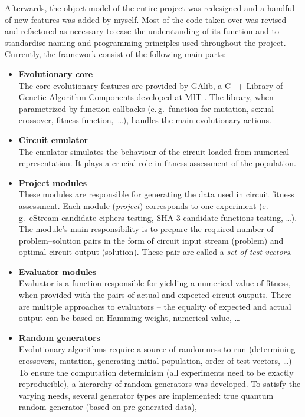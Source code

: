 \documentclass[12pt,oneside]{fithesis2}		%
\renewcommand{\_}{\leavevmode \kern0.0em\vbox{\hrule width0.4em}}
\newcommand{\squarebullet}{\textcolor{black}{\raisebox{0.15em}{\rule{4pt}{4pt}}}}
\newenvironment{myItemize}{
  \begin{itemize}[leftmargin=2em,rightmargin=1em,itemsep=\parskip ,parsep=0em,topsep=0em,partopsep=0em]
  \renewcommand{\labelitemi}{\squarebullet}
  \renewcommand{\labelitemii}{$\diamond$}
}{
  \end{itemize}
}
\begin{document}
Afterwards, the object model of the entire project was redesigned and a handful of new features was added by myself. 
Most of the code taken over was revised and refactored as necessary
to ease the understanding of its function and to standardise naming and programming principles used throughout the project. 
Currently, the framework consist of the following main parts:
\begin{myItemize}
\item \textbf{Evolutionary core}\\
The core evolutionary features are provided by GAlib, a C++ Library of Genetic Algorithm Components developed at MIT \parencite{galib}.
The library, when parametrized by function callbacks (e.\,g.\ function for mutation, sexual crossover, fitness function,~\dots),
handles the main evolutionary actions.
\item \textbf{Circuit emulator}\\
The emulator simulates the behaviour of the circuit loaded from numerical representation. It plays a crucial role in
fitness assessment of the population.
\item \textbf{Project modules}\\
These modules are responsible for generating the data used in circuit fitness assessment. Each module (\textit{project}) corresponds
to one experiment (e.\,g.\ eStream candidate ciphers testing, SHA-3 candidate functions testing, \dots). The module's main
responsibility is to prepare the required number of problem--solution pairs in the form of circuit input stream (problem)
and optimal circuit output (solution). These pair are called a \textit{set of test vectors}.
\item \textbf{Evaluator modules}\\
Evaluator is a function responsible for yielding a numerical value of fitness, when provided with the pairs of
actual and expected circuit outputs. There are multiple approaches to evaluators -- the equality of expected and
actual output can be based on Hamming weight, numerical value, \dots
\item \textbf{Random generators}\\
Evolutionary algorithms require a source of randomness to run (determining crossovers, mutation, generating initial population,
order of test vectors, \dots) To ensure the
computation determinism (all experiments need to be exactly reproducible), a hierarchy of random generators was developed.
To satisfy the varying needs, several generator types are implemented: true quantum random generator (based on pre-generated data),

\end{myItemize}
\end{document}
